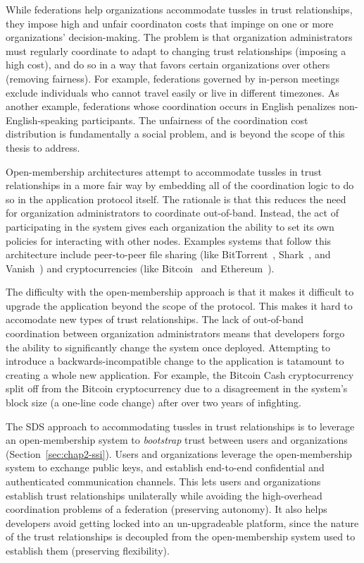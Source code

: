 While federations help organizations accommodate
tussles in trust relationships, they impose high and unfair coordinaton costs
that impinge on one or more organizations' decision-making.  The problem is 
that organization administrators must regularly coordinate to adapt
to changing trust relationships (imposing a high cost), and do so in a way that
favors certain organizations over others (removing fairness).  For example,
federations governed by in-person meetings exclude individuals who cannot
travel easily or live in different timezones.
As another example, federations whose coordination occurs in English
penalizes non-English-speaking participants.  The unfairness of the
coordination cost distribution is fundamentally a social problem, and is beyond
the scope of this thesis to address.

Open-membership architectures attempt to accommodate tussles in trust
relationships in a more fair way by embedding all of the coordination logic to do so in the
application protocol itself.  The rationale is
that this reduces the need for organization administrators to coordinate
out-of-band.  Instead, the act of participating in the system gives
each organization the ability to set its own policies for interacting with other
nodes.  Examples systems that follow this architecture include peer-to-peer file sharing
(like BitTorrent~\cite{bittorrent}, Shark~\cite{shark}, and Vanish~\cite{vanish})
and cryptocurrencies (like Bitcoin~\cite{bitcoin} and Ethereum~\cite{ethereum}).

The difficulty with the open-membership approach is that
it makes it difficult to upgrade the application beyond the scope of the
protocol.  This makes it hard to accomodate new types of trust relationships.
The lack of out-of-band coordination between organization
administrators means that developers forgo the ability to significantly change the
system once deployed.  Attempting to introduce a backwards-incompatible change to the
application is tatamount to creating a whole new application.  For example,
the Bitcoin Cash cryptocurrency~\cite{bcash} split off from the Bitcoin
cryptocurrency due to a disagreement in the system's block size (a one-line code
change) after over two years of infighting.

The SDS approach to accommodating tussles in trust relationships is to leverage
an open-membership system to \emph{bootstrap} trust between
users and organizations (Section~\ref{sec:chap2-ssi}).  Users and
organizations leverage the open-membership system to exchange public keys, and
establish end-to-end confidential and authenticated communication channels.
This lets users and organizations establish trust relationships unilaterally while
avoiding the high-overhead coordination problems of a
federation (preserving autonomy).
It also helps developers avoid getting locked into an un-upgradeable platform,
since the nature of the trust relationships is decoupled from the
open-membership system used to establish them (preserving flexibility).

